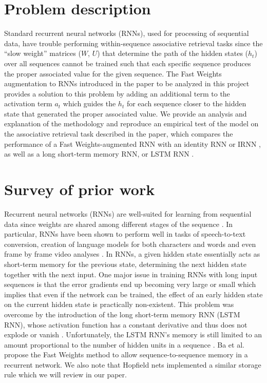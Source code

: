 \section{Problem description}

Standard recurrent neural networks (RNNs), used for processing of sequential data, have trouble performing within-sequence associative retrieval tasks since the ``slow weight'' matrices ($W$, $U$) that determine the path of the hidden states ($h_t$) over all sequences cannot be trained such that each specific sequence produces the proper associated value for the given sequence. The Fast Weights augmentation to RNNs introduced in the paper to be analyzed in this project \cite{DBLP:conf/nips/BaHMLI16} provides a solution to this problem by adding an additional term to the activation term $a_t$ which guides the $h_t$ for each sequence closer to the hidden state that generated the proper associated value. We provide an analysis and explanation of the methodology and reproduce an empirical test of the model on the associative retrieval task described in the paper, which compares the performance of a Fast Weights-augmented RNN with an identity RNN or IRNN \cite{DBLP:journals/corr/LeJH15}, as well as a long short-term memory RNN, or LSTM RNN \cite{DBLP:journals/neco/HochreiterS97}.

\section{Survey of prior work}

Recurrent neural networks (RNNs) are well-suited for learning from sequential data since weights are shared among different stages of the sequence \cite[p. 373]{Goodfellow-et-al-2016}. In particular, RNNs have been shown to perform well in tasks of speech-to-text conversion, creation of language models for both characters and words \cite{DBLP:conf/icml/SutskeverMH11} and even frame by frame video analyses \cite{mnih}. In RNNs, a given hidden state essentially acts as short-term memory for the previous state, determining the next hidden state together with the next input. One major issue in training RNNs with long input sequences is that the error gradients end up becoming very large or small \cite[p. 16]{DBLP:journals/nn/Schmidhuber15} which implies that even if the network can be trained, the effect of an early hidden state on the current hidden state is practically non-existent. This problem was overcome by the introduction of the long short-term memory RNN (LSTM RNN), whose activation function has a constant derivative and thus does not explode or vanish \cite[p. 19]{DBLP:journals/nn/Schmidhuber15}. Unfortunately, the LSTM RNN's memory is still limited to an amount proportional to the number of hidden units in a sequence \cite[p. 1]{DBLP:conf/nips/BaHMLI16}. Ba et al. propose the Fast Weights method to allow sequence-to-sequence memory in a recurrent network. We also note that Hopfield nets \cite{MacKay:2002:ITI:971143} implemented a similar storage rule \cite[p. 2]{DBLP:conf/nips/BaHMLI16} which we will review in our paper.

